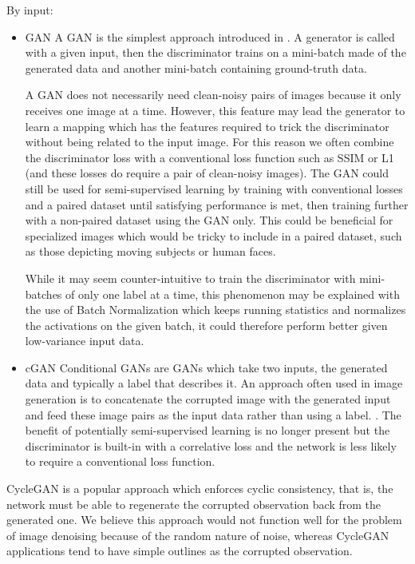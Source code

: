 By input:
\begin{itemize}
  \item \ac{GAN}
  A \ac{GAN} is the simplest approach introduced in \cite{gan}. A generator is called with a given input, then the discriminator trains on a mini-batch made of the generated data and another mini-batch containing ground-truth data.

A \ac{GAN} does not necessarily need clean-noisy pairs of images because it only receives one image at a time. However, this feature may lead the generator to learn a mapping which has the features required to trick the discriminator without being related to the input image. For this reason we often combine the discriminator loss with a conventional loss function such as SSIM or L1 (and these losses do require a pair of clean-noisy images). The GAN could still be used for semi-supervised learning by training with conventional losses and a paired dataset until satisfying performance is met, then training further with a non-paired dataset using the GAN only. This could be beneficial for specialized images which would be tricky to include in a paired dataset, such as those depicting moving subjects or human faces.

While it may seem counter-intuitive to train the discriminator with mini-batches of only one label at a time, this phenomenon may be explained with the use of Batch Normalization which keeps running statistics and normalizes the activations on the given batch, it could therefore perform better given low-variance input data. \cite{gantechniques}\cite{bn} %
  \item \ac{cGAN}
  Conditional \acsp{GAN} are \acsp{GAN} which take two inputs, the generated data and typically a label that describes it. An approach often used in image generation is to concatenate the corrupted image with the generated input and feed these image pairs as the input data rather than using a label. \cite{pix2pix}\cite{cyclegan}\cite{pix2pixhd}. The benefit of potentially semi-supervised learning is no longer present but the discriminator is built-in with a correlative loss and the network is less likely to require a conventional loss function.
\end{itemize}
CycleGAN\cite{cyclegan} is a popular approach which enforces cyclic consistency, that is, the network must be able to regenerate the corrupted observation back from the generated one. We believe this approach would not function well for the problem of image denoising because of the random nature of noise, whereas CycleGAN applications tend to have simple outlines as the corrupted observation.

